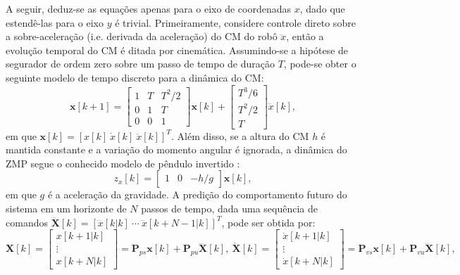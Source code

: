 A seguir, deduz-se as equações apenas para o eixo de coordenadas \( x \), dado que estendê-las para o eixo \( y \) é trivial. Primeiramente, considere controle direto sobre a sobre-aceleração (i.e. derivada da aceleração) do CM do robô  \( \dddot{x} \), então a evolução temporal do CM é ditada por cinemática. Assumindo-se a hipótese de segurador de ordem zero sobre um passo de tempo de duração \( T \), pode-se obter o seguinte modelo de tempo discreto para a dinâmica do CM:
\begin{equation}
\mathrm{\mathbf{x}}[k+1] = \begin{bmatrix}
1 & T & T^2/2 \\ 0 & 1 & T \\ 0 & 0 & 1
\end{bmatrix} \mathrm{\mathbf{x}}[k] + \begin{bmatrix}
T^3/6 \\ T^2/2 \\ T
\end{bmatrix} \dddot{x}[k],
\label{eq:discrete_dynamics_x}
\end{equation}
em que \( \mathrm{\mathbf{x}}[k] = \left[ x[k] \ \dot{x}[k] \ \ddot{x}[k] \right]^T \). Além disso, se a altura do CM \( h \) é mantida constante e a variação do momento angular é ignorada, a dinâmica do ZMP segue o conhecido modelo de pêndulo invertido \cite{kajita2001}:
\begin{equation}
z_x[k] = \begin{bmatrix}
1 & 0 & -h/g
\end{bmatrix} \mathrm{\mathbf{x}}[k],
\label{eq:zmp}
\end{equation}
em que \( g \) é a aceleração da gravidade. A predição do comportamento futuro do sistema em um horizonte de \( N \) passos de tempo, dada uma sequência de comandos \( \dddot{\mathrm{\mathbf{X}}}[k] = \left[\dddot{x}[k|k] \ \cdots \ \dddot{x}[k+N-1|k] \right]^T \), pode ser obtida por:
\begin{equation}
\mathrm{\mathbf{X}}[k] = \begin{bmatrix}
x[k+1|k] \\
\vdots \\
x[k+N|k]
\end{bmatrix} = \mathrm{\mathbf{P}}_{ps} \mathrm{\mathbf{x}}[k] + \mathrm{\mathbf{P}}_{pu} \dddot{\mathrm{\mathbf{X}}}[k], \
\dot{\mathrm{\mathbf{X}}}[k] = \begin{bmatrix}
\dot{x}[k+1|k] \\
\vdots \\
\dot{x}[k+N|k]
\end{bmatrix} = \mathrm{\mathbf{P}}_{vs} \mathrm{\mathbf{x}}[k] + \mathrm{\mathbf{P}}_{vu} \dddot{\mathrm{\mathbf{X}}}[k],
\label{eq:dx_pred}
\end{equation}
